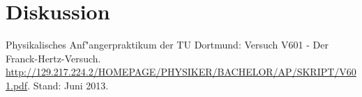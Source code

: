 \section{Diskussion}
\label{sec:diskussion}

\begin{thebibliography}{9}
	 Physikalisches Anf"angerpraktikum der TU Dortmund: Versuch V601 - Der Franck-Hertz-Versuch. \url{http://129.217.224.2/HOMEPAGE/PHYSIKER/BACHELOR/AP/SKRIPT/V601.pdf}. Stand: Juni 2013.
\end{thebibliography}
